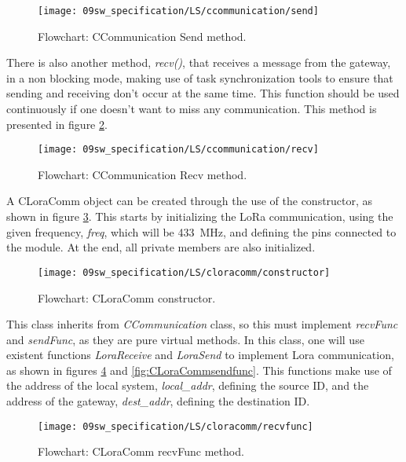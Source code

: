 \begin{figure}[H]
	\centering
	\texttt{[image: 09sw\_specification/LS/ccommunication/send]}
	\caption{Flowchart: CCommunication Send method.}
	\label{fig:CCommunicationsend}
\end{figure}

\clearpage
There is also another method, \textit{recv()}, that receives a message from the gateway, in a non blocking mode, making use of task synchronization tools to ensure that sending and receiving don't occur at the same time. This function should be used continuously if one doesn't want to miss any communication. This method is presented in figure \ref{fig:CCommunicationrecv}.

\begin{figure}[H]
	\centering
	\texttt{[image: 09sw\_specification/LS/ccommunication/recv]}
	\caption{Flowchart: CCommunication Recv method.}
	\label{fig:CCommunicationrecv}
\end{figure}

\clearpage
{}

A CLoraComm object can be created through the use of the constructor, as shown in figure \ref{fig:LoraComm}.
This starts by initializing the LoRa communication, using the given frequency, \textit{freq}, which will be 433~MHz, and defining the pins connected to the module. At the end, all private members are also initialized.

\begin{figure}[H]
	\centering
	\texttt{[image: 09sw\_specification/LS/cloracomm/constructor]}
	\caption{Flowchart: CLoraComm constructor.}
	\label{fig:LoraComm}
\end{figure}

This class inherits from \textit{CCommunication} class, so this must implement \textit{recvFunc} and \textit{sendFunc}, as they are pure virtual methods. In this class, one will use existent functions \textit{LoraReceive} and \textit{LoraSend} to implement Lora communication, as shown in figures \ref{fig:CLoraCommrecvfunc} and \ref{fig:CLoraCommsendfunc}. This functions make use of the address of the local system, \textit{local\_addr}, defining the source ID, and the address of the gateway, \textit{dest\_addr}, defining the destination ID.

\begin{figure}[H]
	\centering		\texttt{[image: 09sw\_specification/LS/cloracomm/recvfunc]}
	\caption{Flowchart: CLoraComm recvFunc method.}
	\label{fig:CLoraCommrecvfunc}
\end{figure}

